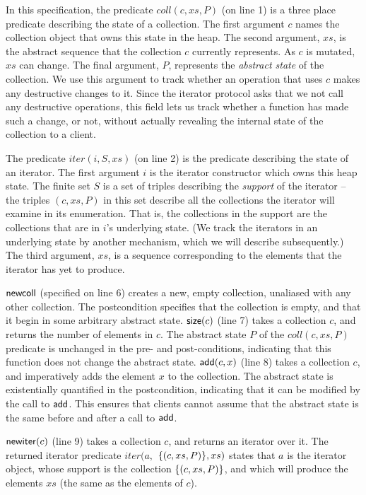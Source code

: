 \documentclass[preprint,natbib]{sigplanconf}
\begin{document}
In this specification, the predicate $coll(c, xs, P)$ (on line 1) is a
three place predicate describing the state of a collection. The first
argument $c$ names the collection object that owns this state in the
heap. The second argument, $xs$, is the abstract sequence that the
collection $c$ currently represents. As $c$ is mutated, $xs$ can
change. The final argument, $P$, represents the \emph{abstract state}
of the collection. We use this argument to track whether an operation
that uses $c$ makes any destructive changes to it. Since the iterator
protocol asks that we not call any destructive operations, this field
lets us track whether a function has made such a change, or not, without
actually revealing the internal state of the collection to a client. 

The predicate $iter(i, S, xs)$ (on line 2) is the predicate describing
the state of an iterator. The first argument $i$ is the iterator
constructor which owns this heap state. The finite set $S$ is a set of
triples describing the \emph{support} of the iterator -- the triples
$(c,xs,P)$ in this set describe all the collections the iterator will
examine in its enumeration. That is, the collections in the support
are the collections that are in $i$'s underlying state. (We track the
iterators in an underlying state by another mechanism, which we will
describe subsequently.) The third argument, $xs$, is a sequence
corresponding to the elements that the iterator has yet to produce.

$\mbox{\textsf{{newcoll}}}$ (specified on line 6) creates a new, empty
collection, unaliased with any other collection. The postcondition
specifies that the collection is empty, and that it begin in some
arbitrary abstract state. $\mbox{\textsf{{size}}}(c)$ (line 7) takes a
collection $c$, and returns the number of elements in $c$. The
abstract state $P$ of the $coll(c, xs, P)$ predicate is unchanged in
the pre- and post-conditions, indicating that this function does not
change the abstract state. $\mbox{\textsf{{add}}}(c, x)$ (line 8) takes a
collection $c$, and imperatively adds the element $x$ to the
collection. The abstract state is existentially quantified in the
postcondition, indicating that it can be modified by the call to
$\mbox{\textsf{{add}}}$. This ensures that clients cannot assume that the 
abstract state is the same before and after a call to $\mbox{\textsf{{add}}}$. 

$\mbox{\textsf{{newiter}}}(c)$ (line 9) takes a collection $c$, and returns an
iterator over it. The returned iterator predicate $iter(a,$
$\{{(c, xs, P)}\}, xs)$ states that $a$ is the iterator object,
whose support is the collection $\{{(c, xs, P)}\}$, and which will
produce the elements $xs$ (the same as the elements of $c$).
\end{document}
